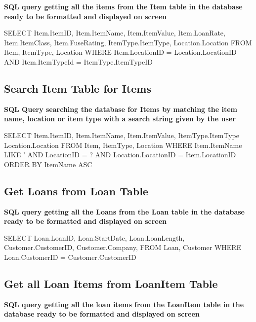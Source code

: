 \textbf{SQL query getting all the items from the Item table in the database ready to be formatted and displayed on screen}

\begin{sql}
      SELECT
      Item.ItemID,
      Item.ItemName,
      Item.ItemValue,
      Item.LoanRate,
      Item.ItemClass,
      Item.FuseRating,
      ItemType.ItemType,
      Location.Location
      FROM Item, ItemType, Location
      WHERE Item.LocationID = Location.LocationID AND Item.ItemTypeId = ItemType.ItemTypeID
\end{sql}

\subsection{Search Item Table for Items}

\textbf{SQL Query searching the database for Items by matching the item name, location or item type with a search string given by the user}

\begin{sql}
    SELECT 
    Item.ItemID,
    Item.ItemName,
    Item.ItemValue,
    ItemType.ItemType
    Location.Location
    FROM Item, ItemType, Location
    WHERE Item.ItemName LIKE '%
    AND LocationID = ? AND
    Location.LocationID = Item.LocationID
    ORDER BY ItemName ASC
\end{sql}

\subsection{Get Loans from Loan Table}

\textbf{SQL query getting all the Loans from the Loan table in the database ready to be formatted and displayed on screen}

\begin{sql}
    SELECT
    Loan.LoanID,
    Loan.StartDate,
    Loan.LoanLength,
    Customer.CustomerID,
    Customer.Company,
    FROM Loan, Customer
    WHERE Loan.CustomerID = Customer.CustomerID
\end{sql}

\subsection{Get all Loan Items from LoanItem Table}

\textbf{SQL query getting all the loan items from the LoanItem table in the database ready to be formatted and displayed on screen}

